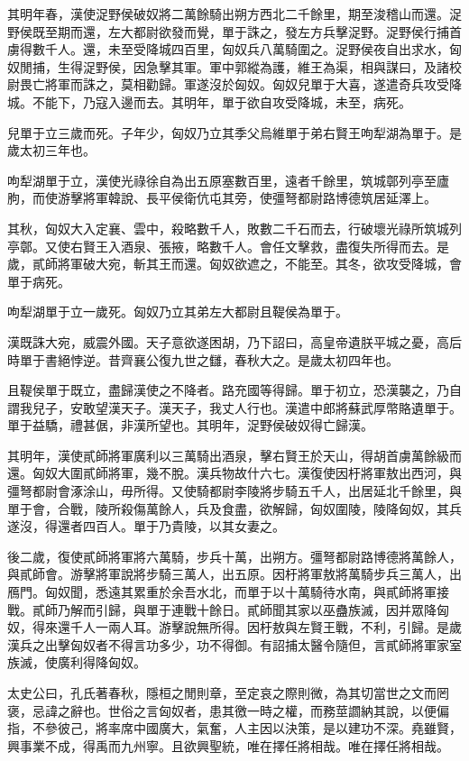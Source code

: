 其明年春，漢使浞野侯破奴將二萬餘騎出朔方西北二千餘里，期至浚稽山而還。浞野侯既至期而還，左大都尉欲發而覺，單于誅之，發左方兵擊浞野。浞野侯行捕首虜得數千人。還，未至受降城四百里，匈奴兵八萬騎圍之。浞野侯夜自出求水，匈奴閒捕，生得浞野侯，因急擊其軍。軍中郭縱為護，維王為渠，相與謀曰，及諸校尉畏亡將軍而誅之，莫相勸歸。軍遂沒於匈奴。匈奴兒單于大喜，遂遣奇兵攻受降城。不能下，乃寇入邊而去。其明年，單于欲自攻受降城，未至，病死。

兒單于立三歲而死。子年少，匈奴乃立其季父烏維單于弟右賢王呴犁湖為單于。是歲太初三年也。

呴犁湖單于立，漢使光祿徐自為出五原塞數百里，遠者千餘里，筑城鄣列亭至廬朐，而使游擊將軍韓說、長平侯衛伉屯其旁，使彊弩都尉路博德筑居延澤上。

其秋，匈奴大入定襄、雲中，殺略數千人，敗數二千石而去，行破壞光祿所筑城列亭鄣。又使右賢王入酒泉、張掖，略數千人。會任文擊救，盡復失所得而去。是歲，貳師將軍破大宛，斬其王而還。匈奴欲遮之，不能至。其冬，欲攻受降城，會單于病死。

呴犁湖單于立一歲死。匈奴乃立其弟左大都尉且鞮侯為單于。

漢既誅大宛，威震外國。天子意欲遂困胡，乃下詔曰，高皇帝遺朕平城之憂，高后時單于書絕悖逆。昔齊襄公復九世之讎，春秋大之。是歲太初四年也。

且鞮侯單于既立，盡歸漢使之不降者。路充國等得歸。單于初立，恐漢襲之，乃自謂我兒子，安敢望漢天子。漢天子，我丈人行也。漢遣中郎將蘇武厚幣賂遺單于。單于益驕，禮甚倨，非漢所望也。其明年，浞野侯破奴得亡歸漢。

其明年，漢使貳師將軍廣利以三萬騎出酒泉，擊右賢王於天山，得胡首虜萬餘級而還。匈奴大圍貳師將軍，幾不脫。漢兵物故什六七。漢復使因杅將軍敖出西河，與彊弩都尉會涿涂山，毋所得。又使騎都尉李陵將步騎五千人，出居延北千餘里，與單于會，合戰，陵所殺傷萬餘人，兵及食盡，欲解歸，匈奴圍陵，陵降匈奴，其兵遂沒，得還者四百人。單于乃貴陵，以其女妻之。

後二歲，復使貳師將軍將六萬騎，步兵十萬，出朔方。彊弩都尉路博德將萬餘人，與貳師會。游擊將軍說將步騎三萬人，出五原。因杅將軍敖將萬騎步兵三萬人，出鴈門。匈奴聞，悉遠其累重於余吾水北，而單于以十萬騎待水南，與貳師將軍接戰。貳師乃解而引歸，與單于連戰十餘日。貳師聞其家以巫蠱族滅，因并眾降匈奴，得來還千人一兩人耳。游擊說無所得。因杅敖與左賢王戰，不利，引歸。是歲漢兵之出擊匈奴者不得言功多少，功不得御。有詔捕太醫令隨但，言貳師將軍家室族滅，使廣利得降匈奴。

太史公曰，孔氏著春秋，隱桓之閒則章，至定哀之際則微，為其切當世之文而罔褒，忌諱之辭也。世俗之言匈奴者，患其徼一時之權，而務莖讇納其說，以便偏指，不參彼己，將率席中國廣大，氣奮，人主因以決策，是以建功不深。堯雖賢，興事業不成，得禹而九州寧。且欲興聖統，唯在擇任將相哉。唯在擇任將相哉。